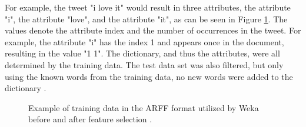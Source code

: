 For example, the tweet "i love it" would result in three attributes, the attribute "i", the attribute "love", and the attribute "it", as can be seen in Figure \ref{fig:arff_train}. The values denote the attribute index and the number of occurrences in the tweet. For example, the attribute "i" has the index 1 and appears once in the document, resulting in the value "1 1". The dictionary, and thus the attributes, were all determined by the training data. The test data set was also filtered, but only using the known words from the training data, no new words were added to the dictionary \cite{Weka}.

\begin{figure}
    \centering
{}
\vspace{5mm}
    \caption{Example of training data in the ARFF format utilized by Weka before and after feature selection \cite{Weka}.}
    \label{fig:arff_train}
\end{figure}

